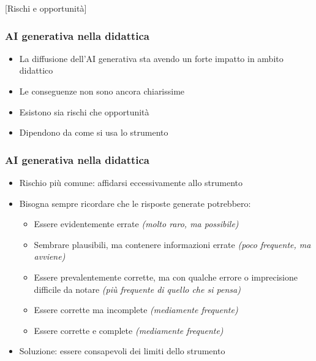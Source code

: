 [Rischi e opportunità]

\begin{contentframe}
    \frametitle{AI generativa nella didattica}

    \begin{itemize}
        \item La diffusione dell'AI generativa sta avendo un forte impatto in ambito didattico

        \bigskip
        \item Le conseguenze non sono ancora chiarissime
        \item Esistono sia rischi che opportunità
        \item Dipendono da come si usa lo strumento
    \end{itemize}
\end{contentframe}

\begin{contentframe}
    \frametitle{AI generativa nella didattica}

    \begin{itemize}
        \item Rischio più comune: affidarsi eccessivamente allo strumento
        \item Bisogna sempre ricordare che le risposte generate potrebbero:
        \begin{itemize}
            \item Essere evidentemente errate \textit{(molto raro, ma possibile)}
            \item Sembrare plausibili, ma contenere informazioni errate \textit{(poco frequente, ma avviene)}
            \item Essere prevalentemente corrette, ma con qualche errore o imprecisione difficile da notare \textit{(più frequente di quello che si pensa)}
            \item Essere corrette ma incomplete \textit{(mediamente frequente)}
            \item Essere corrette e complete \textit{(mediamente frequente)}
        \end{itemize}

        \bigskip
        \item Soluzione: essere consapevoli dei limiti dello strumento
    \end{itemize}
\end{contentframe}

